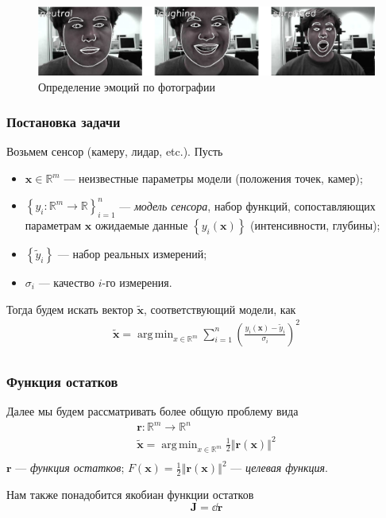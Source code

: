 \documentclass[notheorems,aspectratio=169]{beamer}
\DeclareMathOperator*{\argmin}{arg\,min}
\begin{document}
\begin{frame}
  \begin{figure}
    \includegraphics[width=0.5\linewidth, height=0.5\textheight, keepaspectratio]{emotions.png}
    \caption*{Определение эмоций по фотографии}
  \end{figure}

\end{frame}

\begin{frame}
  \frametitle{Постановка задачи}
  Возьмем сенсор (камеру, лидар, etc.). Пусть 
  \begin{itemize}
  \item $\mathbf{x}\in \mathbb{R}^m$ --- неизвестные параметры модели (положения точек, камер);
  \item $\left\{y_i: \mathbb{R}^m\to \mathbb{R}\right\}_{i=1}^n$ --- \emph{модель сенсора}, набор функций, сопоставляющих параметрам $\mathbf{x}$ ожидаемые данные $\left\{y_i\left(\mathbf{x}\right)\right\}$ (интенсивности, глубины); 
  \item $\left\{\tilde{y}_i\right\}$ --- набор реальных измерений;
  \item $\sigma_i$ --- качество $i$-го измерения.
  \end{itemize} 
  Тогда будем искать вектор $\mathbf{\tilde{x}}$, соответствующий модели, как
  \begin{equation*}
    \begin{gathered}
      \mathbf{\tilde{x}}=\argmin_{x\in \mathbb{R}^m}\sum_{i=1}^n \left(\frac{y_i\left(\mathbf{x}\right)-\tilde{y}_i}{\sigma_i}\right)^2 \\
    \end{gathered}
  \end{equation*}
\end{frame}

\begin{frame} 
  \frametitle{Функция остатков}
  Далее мы будем рассматривать более общую проблему вида
  \begin{equation*}
    \begin{gathered}
      \mathbf{r}: \mathbb{R}^m\to\mathbb{R}^n \\
      \mathbf{\tilde{x}}=\argmin_{x\in\mathbb{R}^m}\frac{1}{2}\left\Vert\mathbf{r}\left(\mathbf{x}\right)\right\Vert^2 \\
    \end{gathered}
  \end{equation*}
  $\mathbf{r}$ --- \emph{функция остатков}; $F\left(\mathbf{x}\right)=\frac{1}{2}\left\Vert\mathbf{r}\left(\mathbf{x}\right)\right\Vert^2$ --- \emph{целевая функция}.
  
  Нам также понадобится якобиан функции остатков
  $$\mathbf{J}=\dd{\mathbf{r}}$$
\end{frame}
\end{document}
